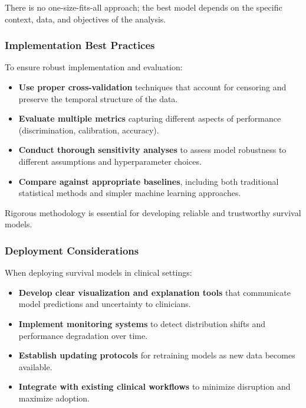 There is no one-size-fits-all approach; the best model depends on the specific context, data, and objectives of the analysis.

\subsubsection{Implementation Best Practices}

To ensure robust implementation and evaluation:

\begin{itemize}
    \item \textbf{Use proper cross-validation} techniques that account for censoring and preserve the temporal structure of the data.
    
    \item \textbf{Evaluate multiple metrics} capturing different aspects of performance (discrimination, calibration, accuracy).
    
    \item \textbf{Conduct thorough sensitivity analyses} to assess model robustness to different assumptions and hyperparameter choices.
    
    \item \textbf{Compare against appropriate baselines}, including both traditional statistical methods and simpler machine learning approaches.
\end{itemize}

Rigorous methodology is essential for developing reliable and trustworthy survival models.

\subsubsection{Deployment Considerations}

When deploying survival models in clinical settings:

\begin{itemize}
    \item \textbf{Develop clear visualization and explanation tools} that communicate model predictions and uncertainty to clinicians.
    
    \item \textbf{Implement monitoring systems} to detect distribution shifts and performance degradation over time.
    
    \item \textbf{Establish updating protocols} for retraining models as new data becomes available.
    
    \item \textbf{Integrate with existing clinical workflows} to minimize disruption and maximize adoption.
\end{itemize}

